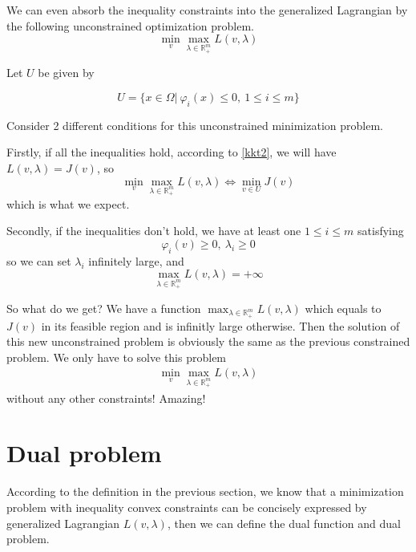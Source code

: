 \documentclass[a4paper]{report}
\begin{document}
We can even absorb the inequality constraints into the generalized Lagrangian by the following unconstrained optimization problem.
\[
    \min_v \max_{\lambda\in\mathbb R_+^m} L(v,\lambda)
\]


Let $U$ be given by

\[
    U=\{x\in\Omega|\ \varphi_i(x)\leq 0,\ 1\leq i\leq m\}
\]

Consider 2 different conditions for this unconstrained minimization problem.

Firstly, if all the inequalities hold, according to \ref{kkt2}, we will have $L(v,\lambda)=J(v)$, so
\[
    \min_v\max_{\lambda\in\mathbb R_+^m} L(v,\lambda) \Leftrightarrow \min_{v\in U} J(v)
\]
which is what we expect.

Secondly, if the inequalities don't hold, we have at least one $1\leq i\leq m$ satisfying
\[
    \varphi_i(v)\geq 0,\ \lambda_i\geq 0
\]
so we can set $\lambda_i$ infinitely large, and
\[
    \max_{\lambda\in\mathbb R_+^m} L(v,\lambda) =+\infty
\]

So what do we get? We have a function $\max_{\lambda\in\mathbb R_+^m} L(v,\lambda)$ which equals to $J(v)$ in its feasible region and is infinitly large otherwise. Then the solution of this new unconstrained problem is obviously the same as the previous constrained problem. We only have to solve this problem
\begin{align}
    \min_v \max_{\lambda\in\mathbb R_+^m} L(v,\lambda) \label{minmax}
\end{align}
without any other constraints! Amazing!

\section{Dual problem}

According to the definition in the previous section, we know that a minimization problem with inequality convex constraints can be concisely expressed by generalized Lagrangian $L(v,\lambda)$, then we can define the dual function and dual problem.
\end{document}
